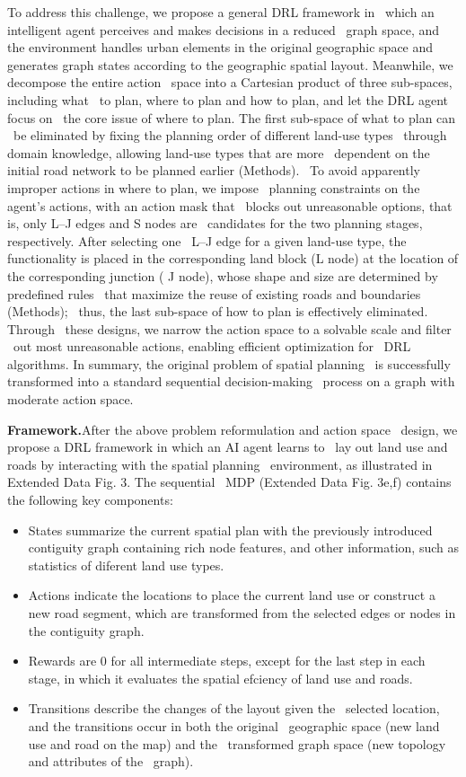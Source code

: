 To address this challenge, we propose a general DRL framework in \
which an intelligent agent perceives and makes decisions in a reduced \
graph space, and the environment handles urban elements in the original geographic space and generates graph states according to the geographic spatial layout. Meanwhile, we decompose the entire action \
space into a Cartesian product of three sub-spaces, including what \
to plan, where to plan and how to plan, and let the DRL agent focus on \
the core issue of where to plan. The first sub-space of what to plan can \
be eliminated by fixing the planning order of different land-use types \
through domain knowledge, allowing land-use types that are more \
dependent on the initial road network to be planned earlier (Methods). \
To avoid apparently improper actions in where to plan, we impose \
planning constraints on the agent’s actions, with an action mask that \
blocks out unreasonable options, that is, only L–J edges and S nodes are \
candidates for the two planning stages, respectively. After selecting one \
L–J edge for a given land-use type, the functionality is placed in the corresponding land block (L node) at the location of the corresponding junction ( J node), whose shape and size are determined by predefined rules \
that maximize the reuse of existing roads and boundaries (Methods); \
thus, the last sub-space of how to plan is effectively eliminated. Through \
these designs, we narrow the action space to a solvable scale and filter \
out most unreasonable actions, enabling efficient optimization for \
DRL algorithms. In summary, the original problem of spatial planning \
is successfully transformed into a standard sequential decision-making \
process on a graph with moderate action space.

\textbf{Framework.}After the above problem reformulation and action space \
design, we propose a DRL framework in which an AI agent learns to \
lay out land use and roads by interacting with the spatial planning \
environment, as illustrated in Extended Data Fig. 3. The sequential \
MDP (Extended Data Fig. 3e,f) contains the following key components:
\begin{itemize}
    \item States summarize the current spatial plan with the previously 
    introduced contiguity graph containing rich node features, and 
    other information, such as statistics of diferent land use types.
    \item Actions indicate the locations to place the current land use or 
    construct a new road segment, which are transformed from the 
    selected edges or nodes in the contiguity graph.
    \item Rewards are 0 for all intermediate steps, except for the last step 
    in each stage, in which it evaluates the spatial efciency of land 
    use and roads.
    \item Transitions describe the changes of the layout given the \
    selected location, and the transitions occur in both the original \
    geographic space (new land use and road on the map) and the \
    transformed graph space (new topology and attributes of the \
    graph).
\end{itemize}

